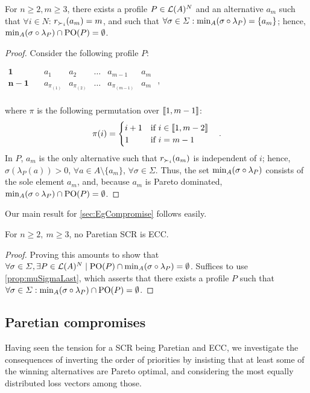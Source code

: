 \begin{proposition} \label{prop:muSigmaLast}
	For $n ≥ 2, m ≥ 3$, there exists a profile $P \in \mathcal{L}(A)^N$ and an alternative $a_m$ such that $\forall i \in N$: $r_{\prefi}(a_m)=m$, and such that $\forall \sigma \in \Sigma: \musigma = \set{a_m}$; hence, $\musigma \cap \paretopt(P) = \emptyset$.
\end{proposition}
\begin{proof}
	Consider the following profile $P$:
	\begin{center}
		$
		\begin{array}{cccccc}
			\mathbf{1} \quad &a_1&a_2&\dots&a_{m-1}&a_m\\
			\mathbf{n-1} \quad &a_{\pi_(1)}&a_{\pi_(2)}&\dots&a_{\pi_(m-1)}&a_m\\
		\end{array}
		$ \quad,
	\end{center}
	where $\pi$ is the following permutation over $\llbracket1, m-1\rrbracket$:
	\[
	\pi(i) = 
	\begin{cases}
		i+1 & \text{if } i \in \llbracket1, m-2\rrbracket \\
		1 & \text{if } i = m-1
	\end{cases} \quad .
	\]
	In $P$, $a_m$ is the only alternative such that $r_{\prefi}(a_m)$ is independent of $i$; hence, $\sigma(\lambda_P(a)) > 0$, $\forall a \in A\setminus \{a_m\}$, $\forall \sigma \in \Sigma$. Thus, the set $\musigma$ consists of the sole element $a_m$, and, because $a_m$ is Pareto dominated, $\musigma \cap \paretopt(P) = \emptyset$.
\end{proof}

Our main result for \cref{sec:EgCompromise} follows easily.
\begin{theorem} \label{th:nonParetian}
	For $n\geq 2, \ m\geq3$, no Paretian \ac{SCR} is \ac{ECC}.
\end{theorem}
\begin{proof}
	Proving this amounts to show that $\forall \sigma \in \Sigma, \exists P \in \linors^N \suchthat \paretopt(P) \cap \musigma = \emptyset$. Suffices to use \cref{prop:muSigmaLast}, which asserts that there exists a profile $P$ such that $\forall \sigma \in \Sigma: \musigma \cap \paretopt(P) = \emptyset$.
\end{proof}

\subsection{Paretian compromises}
Having seen the tension for a \ac{SCR} being Paretian and \ac{ECC}, we investigate the consequences of inverting the order of priorities by insisting that at least some of the winning alternatives are Pareto optimal, and considering the most equally distributed loss vectors among those.

